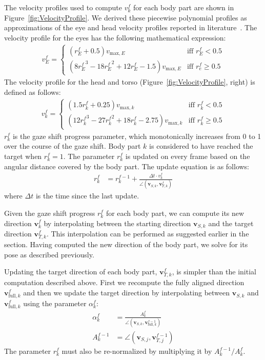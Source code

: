 The velocity profiles used to compute $v^f_k$ for each body part are shown in Figure~\ref{fig:VelocityProfile}. We derived these piecewise polynomial profiles as approximations of the eye and head velocity profiles reported in literature~\citep{kim2007head,lee2002eyes}. The velocity profile for the eyes has the following mathematical expression:
%
\begin{align} \label{eq:EyeVelocity}
v^f_E = \begin{cases}
(r^f_E + 0.5)v_{\mathrm{max},E} & \mbox{iff } r^f_E < 0.5 \\
(8{r^f_E}^3 - 18{r^f_E}^2 + 12r^f_E - 1.5)v_{\mathrm{max},E} & \mbox{iff } r^f_e \geq 0.5
\end{cases}
\end{align}
%
The velocity profile for the head and torso (Figure~\ref{fig:VelocityProfile}, right) is defined as follows:
%
\begin{align} \label{eq:HeadTorsoVelocity}
v^f_k = \begin{cases}
(1.5r^f_k + 0.25)v_{\mathrm{max},k} & \mbox{iff } r^f_k < 0.5 \\
(12{r^f_k}^3 - 27{r^f_k}^2 + 18r^f_k - 2.75)v_{\mathrm{max},k} & \mbox{iff } r^f_k \geq 0.5
\end{cases}
\end{align}
%
$r^f_k$ is the gaze shift progress parameter, which monotonically increases from 0 to 1 over the course of the gaze shift. Body part $k$ is considered to have reached the target when $r^f_k = 1$. The parameter $r^f_k$ is updated on every frame based on the angular distance covered by the body part. The update equation is as follows:
%
\begin{align} \label{eq:RotProgressUpdate}
r^f_k &= r^{f-1}_k + \frac{\Delta t \cdot v^f_k}{\angle(\mathbf{v}_{S,k}, \mathbf{v}^f_{T,k})}
\end{align}
%
where $\Delta t$ is the time since the last update.

Given the gaze shift progress $r^f_k$ for each body part, we can compute its new direction $\mathbf{v}^f_k$ by interpolating between the starting direction $\mathbf{v}_{S,k}$ and the target direction $\mathbf{v}^f_{T,k}$. This interpolation can be performed as suggested earlier in the section. Having computed the new direction of the body part, we solve for its pose as described previously.

Updating the target direction of each body part, $\mathbf{v}^f_{T,k}$, is simpler than the initial computation described above. First we recompute the fully aligned direction $\mathbf{v}^f_{\mathrm{full},k}$ and then we update the target direction by interpolating between $\mathbf{v}_{S,k}$ and $\mathbf{v}^f_{\mathrm{full},k}$ using the parameter $\alpha^f_k$:
%
\begin{align}
\label{eq:TargetRotUpdate}
\alpha^f_k &= \frac{A^f_k}{\angle(\mathbf{v}_{S,k}, \mathbf{v}^{f-1}_{\mathrm{full},k})} \\
A^{f-1}_k &= \angle(\mathbf{v}_{S,j}, \mathbf{v}^{f-1}_{T,j}) \nonumber
\end{align}
%
The parameter $r^f_k$ must also be re-normalized by multiplying it by $A^{f-1}_k / A^f_k$.

